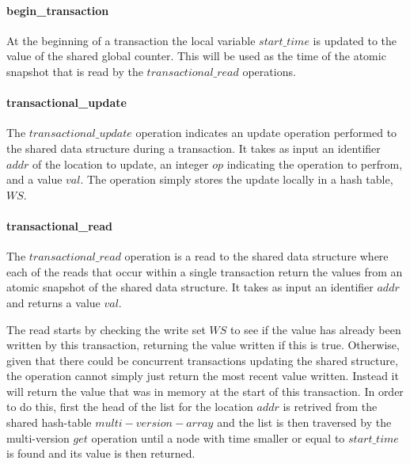 \documentclass[11pt,letterpaper]{article}
\begin{document}
\paragraph{begin\_transaction}
At the beginning of a transaction the local variable $\mathit{start\_time}$
is updated to the value of the shared global counter.
This will be used as the time of the atomic snapshot that is read
by the $\mathit{transactional\_read}$ operations.

\paragraph{transactional\_update}
The $\mathit{transactional\_update}$ operation indicates an update operation
performed to the shared data structure during a transaction.
It takes as input an identifier $\mathit{addr}$ of the location to update,
an integer $\mathit{op}$ indicating the operation to perfrom, and a value $\mathit{val}$.
The operation simply stores the update locally in a hash table, $\mathit{WS}$.


\paragraph{transactional\_read}
The $\mathit{transactional\_read}$ operation is a read to the shared data structure
where each of the reads that occur within a single transaction return the values from
an atomic snapshot of the shared data structure.
It takes as input an identifier $\mathit{addr}$ and returns a value $\mathit{val}$.

The read starts by checking the write set $\mathit{WS}$ to see if the value has already been written
by this transaction, returning the value written if this is true.
Otherwise, given that there could be concurrent transactions updating the shared structure,
the operation cannot simply just return the most recent value written.
Instead it will return the value that was in memory at the start of this transaction.
In order to do this, first the head of the list for the location $\mathit{addr}$ is retrived
from the shared hash-table $\mathit{multi-version-array}$ and the list is then traversed
by the multi-version $\mathit{get}$ operation
until a node with time smaller or equal to $\mathit{start\_time}$ is found and
its value is then returned.
\end{document}
